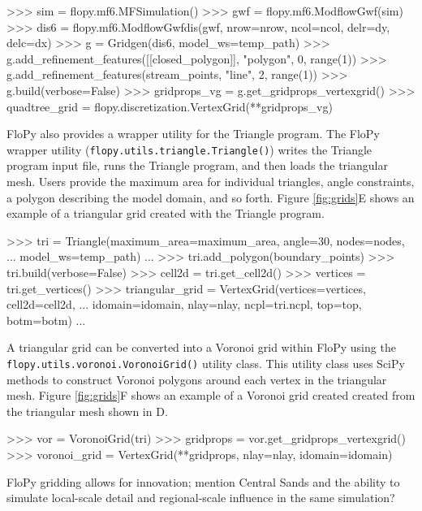 \documentclass[11pt, oneside]{article}   	%
\begin{document}
\begin{python}
>>> sim = flopy.mf6.MFSimulation()
>>> gwf = flopy.mf6.ModflowGwf(sim)
>>> dis6 = flopy.mf6.ModflowGwfdis(gwf, nrow=nrow, ncol=ncol, delr=dy, delc=dx)
>>> g = Gridgen(dis6, model_ws=temp_path)
>>> g.add_refinement_features([[closed_polygon]], "polygon", 0, range(1))
>>> g.add_refinement_features(stream_points, "line", 2, range(1))
>>> g.build(verbose=False)
>>> gridprops_vg = g.get_gridprops_vertexgrid()
>>> quadtree_grid = flopy.discretization.VertexGrid(**gridprops_vg)
\end{python}

FloPy also provides a wrapper utility for the Triangle \citep{trianglemesh} program.  The FloPy wrapper utility (\texttt{flopy.utils.triangle.Triangle()}) writes the Triangle program input file, runs the Triangle program, and then loads the triangular mesh.  Users provide the maximum area for individual triangles, angle constraints, a polygon describing the model domain, and so forth.  Figure \ref{fig:grids}E shows an example of a triangular grid created with the Triangle program.

\begin{python}
>>> tri = Triangle(maximum_area=maximum_area, angle=30, nodes=nodes, 
... model_ws=temp_path)
...
>>> tri.add_polygon(boundary_points)
>>> tri.build(verbose=False)
>>> cell2d = tri.get_cell2d()
>>> vertices = tri.get_vertices()
>>> triangular_grid = VertexGrid(vertices=vertices, cell2d=cell2d, 
... idomain=idomain, nlay=nlay, ncpl=tri.ncpl, top=top, botm=botm)
...
\end{python}

A triangular grid can be converted into a Voronoi grid within FloPy using the \texttt{flopy.utils.voronoi.VoronoiGrid()} utility class.  This utility class uses SciPy methods  \citep{2020SciPy-NMeth} to construct Voronoi polygons around each vertex in the triangular mesh.  Figure \ref{fig:grids}F shows an example of a Voronoi grid created created from the triangular mesh shown in D.

\begin{python}
>>> vor = VoronoiGrid(tri)
>>> gridprops = vor.get_gridprops_vertexgrid()
>>> voronoi_grid = VertexGrid(**gridprops, nlay=nlay, idomain=idomain)
\end{python}

FloPy gridding allows for innovation; mention Central Sands and the ability to simulate local-scale detail and regional-scale influence in the same simulation?
\end{document}
